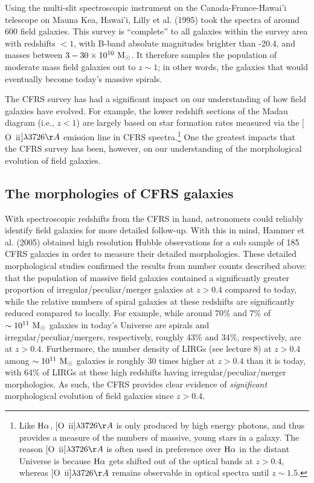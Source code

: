 \documentclass[11pt]{article}
\begin{document}
Using the multi-slit spectroscopic instrument on the
Canada-France-Hawai'i telescope on Mauna Kea, Hawai'i, Lilly et
al. (1995) took the spectra of around 600 field galaxies. This survey
is ``complete'' to all galaxies within the survey area with redshifts
$<1$, with B-band absolute magnitudes brighter than -20.4, and masses
between $3-30\times10^{10}~{\rm M_\odot}$. It therefore samples the
population of moderate mass field galaxies out to $z\sim1$; in other
words, the galaxies that would eventually become today's massive
spirals.

The CFRS survey has had a significant impact on our understanding of
how field galaxies have evolved. For example, the lower redshift
sections of the Madau diagram (i.e., $z<1$) are largely based on star
formation rates measured via the $[$O~{\sc ii}$]\lambda3726\AA$ emission
line in CFRS spectra.\footnote{Like ${\rm H\alpha}$,
  $[$O~{\sc ii}$]\lambda3726\AA$ is only produced by high energy
  photons, and thus provides a measure of the numbers of massive,
  young stars in a galaxy. The reason $[$O~{\sc ii}$]\lambda3726\AA$ is
  often used in preference over ${\rm H\alpha}$ in the distant
  Universe is because ${\rm H\alpha}$ gets shifted out of the optical
  bands at $z>0.4$, whereas $[$O~{\sc ii}$]\lambda3726\AA$ remains
  observable in optical spectra until $z\sim1.5$.} One the greatest
impacts that the CFRS survey has been, however, on our understanding
of the morphological evolution of field galaxies.

\subsection{The morphologies of CFRS galaxies}
With spectroscopic redshifts from the CFRS in hand, astronomers could
reliably identify field galaxies for more detailed follow-up. With
this in mind, Hammer et al. (2005) obtained high resolution Hubble
observations for a sub sample of 185 CFRS galaxies in order to measure
their detailed morphologies. These detailed morphological studies
confirmed the results from number counts described above: that the
population of massive field galaxies contained a significantly greater
proportion of irregular/peculiar/merger galaxies at $z>0.4$ compared
to today, while the relative numbers of spiral galaxies at these
redshifts are significantly reduced compared to locally. For example,
while around 70\% and 7\% of $\sim10^{11}~{\rm M_{\odot}}$ galaxies in
today's Universe are spirals and irregular/peculiar/mergers,
respectively, roughly 43\% and 34\%, respectively, are at
$z>0.4$. Furthermore, the number density of LIRGs (see lecture 8) at
$z>0.4$ among $\sim10^{11}~{\rm M_{\odot}}$ galaxies is roughly 30
times higher at $z>0.4$ than it is today, with 64\% of LIRGs at these
high redshifts having irregular/peculiar/merger morphologies. As such,
the CFRS provides clear evidence of {\it significant} morphological
evolution of field galaxies since $z>0.4$.
\end{document}
